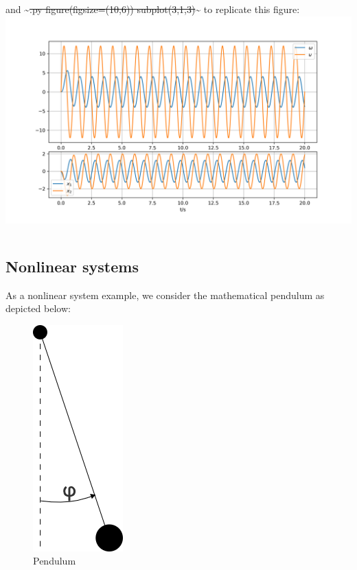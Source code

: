 \documentclass[11pt,a4paper, d]{scrartcl}
\makeatletter
\newcommand{\boxspacing}{\kern\kvtcb@left@rule\kern\kvtcb@boxsep}
\newcommand{\prompt}[4]{
        {\ttfamily\llap{{\color{#2}[#3]:\hspace{3pt}#4}}\vspace{-\baselineskip}}
    }
\makeatother
\begin{document}
\begin{enumerate}
  and \textasciitilde{}\sout{.py figure(figsize=(10,6))
  subplot(3,1,3)}\textasciitilde{} to replicate this figure:
  \includegraphics{figures/DCMotorSim.png}
\end{enumerate}

    \begin{tcolorbox}[breakable, size=fbox, boxrule=1pt, pad at break*=1mm,colback=cellbackground, colframe=cellborder]
\prompt{In}{incolor}{ }{\boxspacing}
\begin{Verbatim}[commandchars=\\\{\}]

\end{Verbatim}
\end{tcolorbox}

    \hypertarget{nonlinear-systems}{%
\subsection{Nonlinear systems}\label{nonlinear-systems}}

As a nonlinear system example, we consider the mathematical pendulum as
depicted below:

\begin{figure}
\centering
\includegraphics{figures/Pendulum.png}
\caption{Pendulum}
\end{figure}
\end{document}
